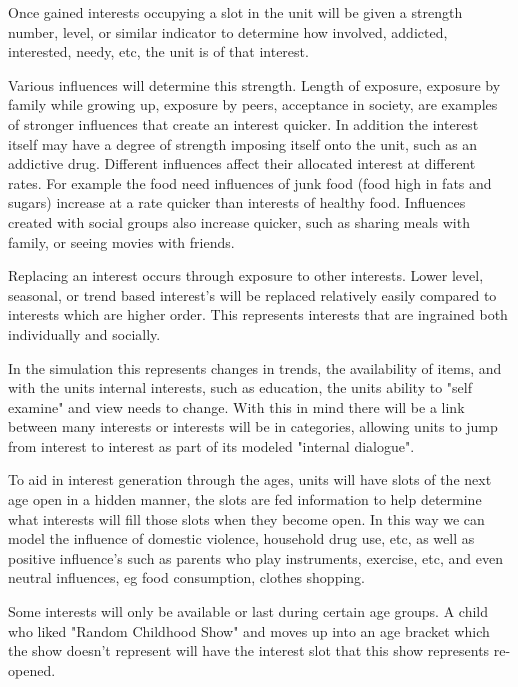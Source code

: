 Once gained interests occupying a slot in the unit will be given a strength number, level, or similar indicator to determine how involved, addicted, interested, needy, etc, the unit is of that interest. 

Various influences will determine this strength. Length of exposure, exposure by family while growing up, exposure by peers, acceptance in society, are examples of stronger influences that create an interest quicker. In addition the interest itself may have a degree of strength imposing itself onto the unit, such as an addictive drug. Different influences affect their allocated interest at different rates. For example the food need influences of junk food (food high in fats and sugars) increase at a rate quicker than interests of healthy food. Influences created with social groups also increase quicker, such as sharing meals with family, or seeing movies with friends.


Replacing an interest occurs through exposure to other interests. Lower level, seasonal, or trend based interest's will be replaced relatively easily compared to interests which are higher order. This represents interests that are ingrained both individually and socially. 

In the simulation this represents changes in trends, the availability of items, and with the units internal interests, such as education, the units ability to "self examine" and view needs to change. With this in mind there will be a link between many interests or interests will be in categories, allowing units to jump from interest to interest as part of its modeled "internal dialogue".

To aid in interest generation through the ages, units will have slots of the next age open in a hidden manner, the slots are fed information to help determine what interests will fill those slots when they become open. In this way we can model the influence of domestic violence, household drug use, etc, as well as positive influence's such as parents who play instruments, exercise, etc, and even neutral influences, eg food consumption, clothes shopping.

Some interests will only be available or last during certain age groups. A child who liked "Random Childhood Show" and moves up into an age bracket which the show doesn't represent will have the interest slot that this show represents re-opened. 

